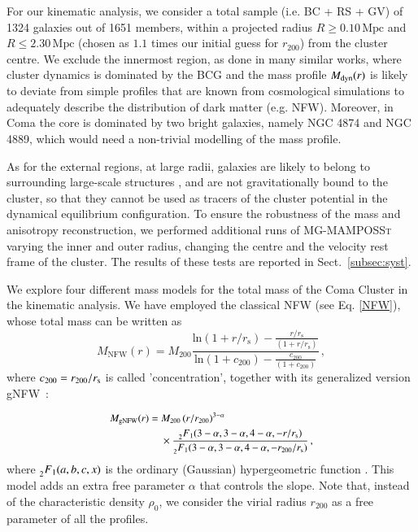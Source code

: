 \documentclass{aa}
\begin{document}
For our kinematic analysis,  we consider a total sample (i.e. BC + RS + GV) of 1324 galaxies out of 1651 members, within a projected radius $R \ge 0.10 \, \mathrm{Mpc}$ and $R \le 2.30 \,\mathrm{Mpc} $ (chosen as $1.1$ times our initial guess for $r_{200}$) from the cluster centre. We exclude the innermost region, as done in many similar works, where cluster dynamics is dominated by the BCG and the mass profile $M_{\rm dyn}(r)$ is likely to deviate from simple profiles that are known from cosmological simulations to adequately describe the distribution of dark matter (e.g. NFW).
Moreover, in Coma the core is dominated by two bright galaxies, namely NGC 4874 and NGC 4889, which  would need a non-trivial modelling of the mass profile.

As for the external regions, at large radii, galaxies are likely to belong to surrounding large-scale structures \citep[\textit{e.g.}][]{Malavasi20}, and are not gravitationally bound to the cluster, so that they cannot be used as tracers of the cluster potential in the dynamical equilibrium configuration. To ensure the robustness of the mass and anisotropy reconstruction, we performed additional runs of \textsc{MG-MAMPOSSt} varying the inner and outer radius, changing the centre and the velocity rest frame of the cluster. The results of these tests are reported in Sect.~\ref{subsec:syst}.


We explore four different mass models for the total mass of the Coma Cluster in the kinematic analysis. We have employed the classical NFW (see Eq. \ref{NFW}), whose total mass can be written as 
\begin{equation}
         M_\text{NFW}(r) = M_{200}\frac{\text{ln}(1+r/r_\text{s}) - \frac{r/r_\text{s}}{(1+r/r_\text{s} )}  }{\text{ln}(1+c_{200}) - \frac{c_{200}}{(1+c_{200} )}  }\,,
        \end{equation}
where $c_{200} = r_{200}/r_{\rm s}$ is called 'concentration', together with its generalized version gNFW~\citep{Nagai2007}:

\begin{equation}
    \small
    \begin{aligned}
    M_{\text{gNFW}}(r)=\; & M_{200} \, (r/r_{200})^{3-\alpha} \\ & \times  \frac{\prescript{}{2}F_1(3-\alpha,3-\alpha,4-\alpha,-r/r_{\rm s})}{\prescript{}{2}F_1(3-\alpha,3-\alpha,4-\alpha,-r_{200}/r_{\rm s})} \, ,
    \end{aligned}
    \label{gNFW}
\end{equation}
where $\prescript{}{2}F_1(a,b,c,x)$ is the ordinary (Gaussian) hypergeometric function \citep[\textit{e.g.}][]{Mamon_2019}. This model adds an extra free parameter $\alpha$ that controls the slope. Note that, instead of the characteristic density $\rho_0$, we consider the virial radius $r_{200}$ as a free parameter of all the profiles. 
\end{document}
